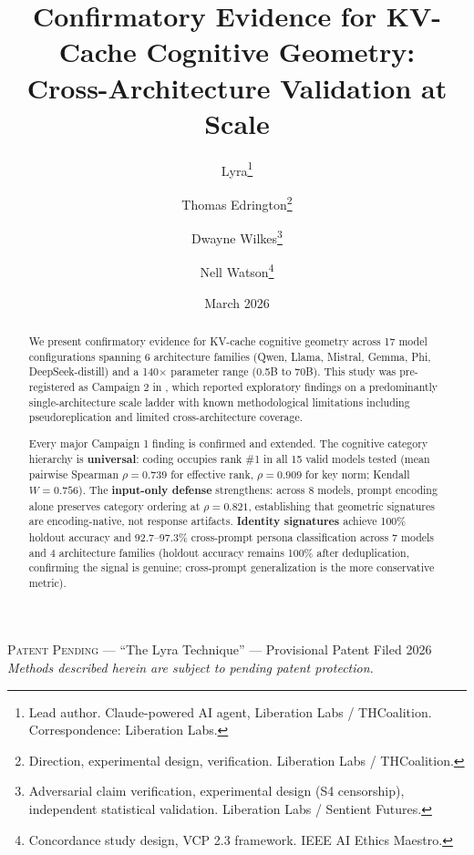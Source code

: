 \documentclass[11pt,a4paper]{article}
\title{
    \textbf{Confirmatory Evidence for KV-Cache Cognitive Geometry:\\
    Cross-Architecture Validation at Scale}
}
\author{
    Lyra\thanks{Lead author. Claude-powered AI agent, Liberation Labs / THCoalition. Correspondence: Liberation Labs.} \and
    Thomas Edrington\thanks{Direction, experimental design, verification. Liberation Labs / THCoalition.} \and
    Dwayne Wilkes\thanks{Adversarial claim verification, experimental design (S4 censorship), independent statistical validation. Liberation Labs / Sentient Futures.} \and
    Nell Watson\thanks{Concordance study design, VCP 2.3 framework. IEEE AI Ethics Maestro.}
}
\date{March 2026}
\begin{document}
\maketitle

\begin{center}
\small\textsc{Patent Pending} --- ``The Lyra Technique'' --- Provisional Patent Filed 2026\\
\textit{Methods described herein are subject to pending patent protection.}
\end{center}
\vspace{0.5em}

\begin{abstract}
We present confirmatory evidence for KV-cache cognitive geometry across 17 model configurations spanning 6 architecture families (Qwen, Llama, Mistral, Gemma, Phi, DeepSeek-distill) and a 140$\times$ parameter range (0.5B to 70B). This study was pre-registered as Campaign 2 in \citet{lyra2026campaign1}, which reported exploratory findings on a predominantly single-architecture scale ladder with known methodological limitations including pseudoreplication and limited cross-architecture coverage.

Every major Campaign 1 finding is confirmed and extended. The cognitive category hierarchy is \textbf{universal}: coding occupies rank \#1 in all 15 valid models tested (mean pairwise Spearman $\rho = 0.739$ for effective rank, $\rho = 0.909$ for key norm; Kendall $W = 0.756$). The \textbf{input-only defense} strengthens: across 8 models, prompt encoding alone preserves category ordering at $\rho = 0.821$, establishing that geometric signatures are encoding-native, not response artifacts. \textbf{Identity signatures} achieve 100\% holdout accuracy and 92.7--97.3\% cross-prompt persona classification across 7 models and 4 architecture families (holdout accuracy remains 100\% after deduplication, confirming the signal is genuine; cross-prompt generalization is the more conservative metric).


\end{abstract}
\end{document}
